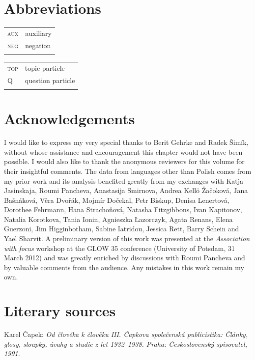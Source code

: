 \documentclass[output=paper,colorlinks,citecolor=brown]{langscibook}
\begin{document}
\section*{Abbreviations}

\begin{tabularx}{.5\textwidth}{@{}lQ}
\textsc{aux}&auxiliary\\
\textsc{neg}&negation\\
&\\
\end{tabularx}%
\begin{tabularx}{.5\textwidth}{lQ@{}}
\textsc{top}&topic particle\\
\textsc{Q}&question particle\\
&\\ %
\end{tabularx}

\section*{Acknowledgements}
I would like to express my very special thanks to Berit Gehrke and Radek Šimík, without whose assistance and encouragement this chapter would not have been possible. I would also like to thank
the anonymous reviewers for this volume for their insightful comments. The data from languages other than Polish comes from my prior work and its analysis benefited greatly from my exchanges with Katja Jasinskaja, Roumi Pancheva, Anastasija Smirnova, Andrea Kellö Žačoková, Jana Bašnáková, Věra Dvořák, Mojmír Dočekal, Petr Biskup, Denisa Lenertová, Dorothee Fehrmann, Hana Strachoňová, Natasha Fitz\-gibbons, Ivan Kapitonov, Natalia Korotkova, Tania Ionin, Agnieszka Łazorczyk, Agata Renans, Elena Guerzoni, Jim Higginbotham, Sabine Iatridou, Jessica Rett, Barry Schein and Yael Sharvit. A preliminary version of this work was presented at the \textit{Association with focus} workshop at the GLOW 35 conference (University of Potsdam, 31 March 2012) and was greatly enriched by discussions with Roumi Pancheva and by valuable comments from the audience. Any mistakes in this work remain my own.


\section*{Literary sources}

Karel Čapek: \textit{Od člověka k člověku III. Čapkova společenská publicistika: Články, glosy, sloupky, úvahy a studie z let 1932--1938. Praha: Československý spisovatel, 1991.}

\sloppy
\printbibliography[heading=subbibliography,notkeyword=this]
\end{document}
